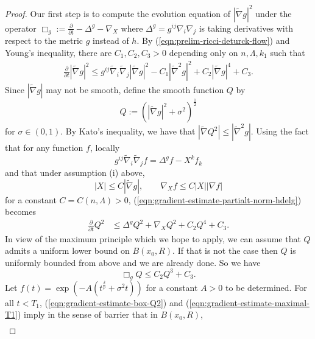 \documentclass[12pt]{amsart}
\theoremstyle{plain}
\theoremstyle{plain}
\theoremstyle{definition}
\theoremstyle{remark}
\numberwithin{equation}{subsection}
\newcommand{\del}{\nabla}
\newcommand{\hdel}{\tilde{\nabla}}
\begin{document}
\begin{proof}
    Our first step is to compute the evolution equation of $|\hdel g|^2$ under the operator $\Box_g := \frac{\partial}{\partial t} - \Delta^{g} - \nabla_X$ where $\Delta^g = g^{ij}\del_i\del_j$ is taking derivatives with respect to the metric $g$ instead of $h$. By (\ref{eqn:prelim-ricci-deturck-flow}) and Young's inequality, there are $C_1, C_2, C_3 > 0$ depending only on $n, \Lambda, k_1$ such that
    \begin{align}\label{eqn:gradient-estimate-partialt-norm-hdelg}
        \frac{\partial}{\partial t} |\hdel g|^2 \leq g^{ij}\hdel_i\hdel_j|\hdel g|^2 - C_1|\hdel^2 g|^2 + C_2 |\hdel g|^4 + C_3.
    \end{align}
    Since $|\hdel g|$ may not be smooth, define the smooth function $Q$ by
    \begin{equation*}
        Q := \left(|\hdel g|^2 + \sigma^2\right)^{\frac{1}{2}}
    \end{equation*}
    for $\sigma \in (0, 1)$. By Kato's inequality, we have that $|\hdel Q^2|\leq |\hdel^2 g|$. Using the fact that for any function $f$, locally
    \begin{equation*}
        g^{ij}\hdel_i\hdel_j f = \Delta^g f - X^kf_k
    \end{equation*}
    and that under assumption (i) above,
    \begin{equation*}
        |X|\leq C|\hdel g|,\qquad \del_X f \leq C|X||\del f|
    \end{equation*}
    for a constant $C = C(n,\Lambda) > 0$, (\ref{eqn:gradient-estimate-partialt-norm-hdelg}) becomes
    \begin{align}\label{eqn:gradient-estimate-partialt-Qsquared}
        \frac{\partial}{\partial t} Q^2 &\leq \Delta^g Q^2 + \del_X Q^2 + C_2Q^4 + C_3.
    \end{align}
    In view of the maximum principle which we hope to apply, we can assume that $Q$ admits a uniform lower bound on $B(x_0, R)$. If that is not the case then $Q$ is uniformly bounded from above and we are already done. So we have
    \begin{equation}\label{eqn:gradient-estimate-box-Q2}
        \Box_g Q \leq C_2 Q^3 + C_3.
    \end{equation}
    Let $f(t) = \exp\left(-A(t^{\frac{\delta}{p}} + \sigma^2 t)\right)$ for a constant $A > 0$ to be determined. For all $t < T_1$, (\ref{eqn:gradient-estimate-box-Q2}) and (\ref{eqn:gradient-estimate-maximal-T1}) imply in the sense of barrier that in $B(x_0, R)$,
    \begin{align}\label{eqn:gradient-estimate-box-Q3}

\end{align}
\end{proof}
\end{document}
